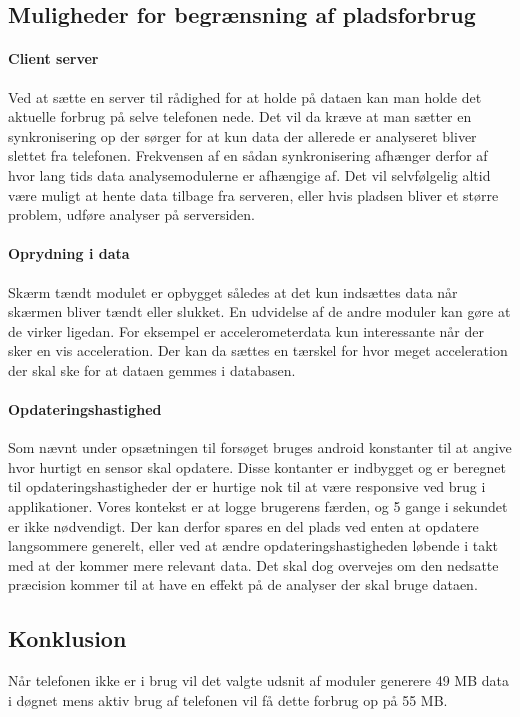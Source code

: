 \subsection{Muligheder for begrænsning af pladsforbrug}

\paragraph{Client server}
Ved at sætte en server til rådighed for at holde på dataen kan man holde det aktuelle forbrug på selve telefonen nede.
Det vil da kræve at man sætter en synkronisering op der sørger for at kun data der allerede er analyseret bliver slettet fra telefonen. 
Frekvensen af en sådan synkronisering afhænger derfor af hvor lang tids data analysemodulerne er afhængige af.
Det vil selvfølgelig altid være muligt at hente data tilbage fra serveren, eller hvis pladsen bliver et større problem, udføre analyser på serversiden.

\paragraph{Oprydning i data}
Skærm tændt modulet er opbygget således at det kun indsættes data når skærmen bliver tændt eller slukket.
En udvidelse af de andre moduler kan gøre at de virker ligedan. 
For eksempel er accelerometerdata kun interessante når der sker en vis acceleration.
Der kan da sættes en tærskel for hvor meget acceleration der skal ske for at dataen gemmes i databasen.

\paragraph{Opdateringshastighed}
Som nævnt under opsætningen til forsøget bruges android konstanter til at angive hvor hurtigt en sensor skal opdatere.
Disse kontanter er indbygget og er beregnet til opdateringshastigheder der er hurtige nok til at være responsive ved brug i applikationer.
Vores kontekst er at logge brugerens færden, og 5 gange i sekundet er ikke nødvendigt.
Der kan derfor spares en del plads ved enten at opdatere langsommere generelt, eller ved at ændre opdateringshastigheden løbende i takt med at der kommer mere relevant data.
Det skal dog overvejes om den nedsatte præcision kommer til at have en effekt på de analyser der skal bruge dataen.

\subsection{Konklusion}
Når telefonen ikke er i brug vil det valgte udsnit af moduler generere 49 MB data i døgnet mens aktiv brug af telefonen vil få dette forbrug op på 55 MB.

